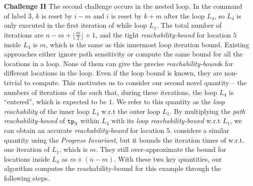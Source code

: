 \textbf{Challenge II} The second challenge occurs in the nested loop.
In the command of label 3, $k$ is reset by $i - m$ and $i$ is reset by $k + m$ after the
loop $L_4$, so $L_4$ is only executed in the first iteration of while loop $L_1$.
The total number of iterations are
$n - m + \lfloor\frac{m}{2}\rfloor + 1$,
and the tight \emph{reachability-bound} for location $5$ inside $L_4$ is $m$, which is the same as this innermost loop iteration bound.
Existing approaches either ignore path sensitivity or compute the same bound for all the locations in a loop.
None of them can give the precise \emph{reachability-bound}s for different locations in the loop.
Even if the loop bound is known, they are non-trivial to compute.
This motivates us to consider our second novel quantity --
the numbers of iterations of the  such that,
during these iterations, the loop $L_4$ is ``entered'', which is expected to be $1$. 
We refer to this quantity as the \emph{loop reachability} of the inner loop $L_4$ w.r.t the outer loop $L_1$.
By multiplying the \emph{path reachability-bound} of $\mathtt{tp}_3$ within $L_4$
with its \emph{loop reachability-bound} w.r.t $L_1$, we can obtain an accurate
\emph{reachability-bound} for location $5$.
\cite{GulwaniJK09} considers a similar quantity using the \emph{Progress Invariant}, but it bounds the iteration times of  w.r.t. one iteration of $L_1$, which is $m$. They still over-approximate the bound for locations inside $L_4$ as $m \times (n - m)$.
With these two key quantities, our algorithm computes the reachability-bound for this example through the following steps.
